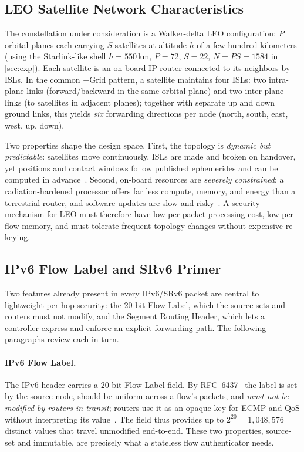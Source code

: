 \subsection{LEO Satellite Network Characteristics}
\label{sec:leo-char}

The constellation under consideration is a Walker-delta LEO configuration: $P$ orbital planes each carrying
$S$ satellites at altitude $h$ of a few hundred kilometers (using the
Starlink-like shell $h=550$\,km, $P=72$, $S=22$, $N=PS=1584$ in
\cref{sec:exp}). Each satellite is an on-board IP router connected to its
neighbors by ISLs. In the common $+$Grid pattern, a satellite maintains four ISLs: two
intra-plane links (forward/backward in the same orbital plane) and two
inter-plane links (to satellites in adjacent planes); together with separate
up and down ground links, this yields \emph{six} forwarding directions per
node (north, south, east, west, up, down).

Two properties shape the design space. First, the topology is
\emph{dynamic but predictable}: satellites move continuously, ISLs are made and
broken on handover, yet positions and contact windows follow published
ephemerides and can be computed in advance~\cite{handley,giuliari,kassing2023}. Second,
on-board resources are \emph{severely constrained}: a radiation-hardened
processor offers far less compute, memory, and energy than a terrestrial router,
and software updates are slow and risky~\cite{denby,del2019}. A security
mechanism for LEO must therefore have low per-packet processing cost, low
per-flow memory, and must tolerate frequent topology changes without expensive
re-keying.

\subsection{IPv6 Flow Label and SRv6 Primer}
\label{sec:fl-srv6}

Two features already present in every IPv6/SRv6 packet are central to
lightweight per-hop security: the 20-bit Flow Label, which the source sets and
routers must not modify, and the Segment Routing Header, which lets a controller
express and enforce an explicit forwarding path. The following paragraphs review
each in turn.

\paragraph{IPv6 Flow Label.}
The IPv6 header carries a 20-bit Flow Label field. By RFC~6437~\cite{rfc6437}
the label is set by the source node, should be uniform across a flow's packets,
and \emph{must not be modified by routers in transit}; routers use it as an
opaque key for ECMP and QoS without interpreting its
value~\cite{rfc6438}. The field thus provides up to $2^{20}=1{,}048{,}576$
distinct values that travel unmodified end-to-end. These two properties,
source-set and immutable, are precisely what a stateless flow authenticator
needs.

